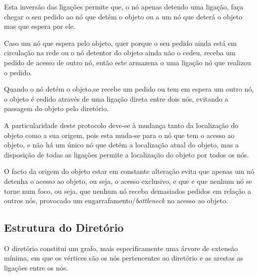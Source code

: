 Esta inversão das ligações permite que, o nó apenas detendo uma ligação, faça chegar o seu pedido ao nó que detém o objeto ou a um nó que deterá o objeto mas que espera por ele.

Caso um nó que espera pelo objeto, quer porque o seu pedido ainda está em circulação na rede ou o nó detentor do objeto ainda não o cedeu, receba um pedido de acesso de outro nó, então este armazena o uma ligação nó que realizou o pedido.

Quando o nó detém o objeto,se recebe um pedido ou tem em espera um outro nó, o objeto é cedido através de uma ligação direta entre dois nós, evitando a passagem do objeto pelo diretório.

A particularidade deste protocolo deve-se à mudança tanto da localização do objeto como a sua origem, pois esta muda-se para o nó que tem o acesso ao objeto, e não há um único nó que detém a localização atual do objeto, mas a disposição de todas as ligações permite a localização do objeto por todos os nós.

O facto da origem do objeto estar em constante alteração evita que apenas um nó detenha o acesso ao objeto, ou seja, o acesso exclusivo, e que e que nenhum nó se torne num foco, ou seja, que nenhum nó receba demasiados pedidos em relação a outros nós, provocado um engarrafamento/\emph{bottleneck} no acesso ao objeto.


\subsection{Estrutura do Diretório}


O diretório constitui um grafo, mais especificamente uma árvore de extensão mínima, em que os vértices são os nós pertencentes ao diretório e as arestas as ligações entre os nós.


\begin{comment}
     elementos
     - Nodes
    vértices do grafo
     

     - Ligações entre os nodes (ligação de finds e ligação do MyChan, ver ARVY)
     explicar porque é que as ligações viram
     - envios do obj são diretos
\end{comment}


